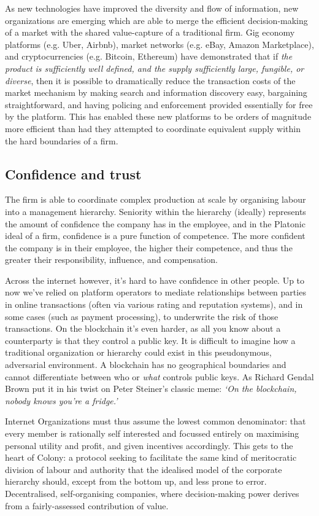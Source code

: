 As new technologies have improved the diversity and flow of information, new organizations are emerging which are able to merge the efficient decision-making of a market with the shared value-capture of a traditional firm. Gig economy platforms (e.g. Uber, Airbnb), market networks (e.g. eBay, Amazon Marketplace), and cryptocurrencies (e.g. Bitcoin, Ethereum) have demonstrated that if \textit{the product is sufficiently well defined, and the supply sufficiently large, fungible, or diverse}, then it is possible to dramatically reduce the transaction costs of the market mechanism by making search and information discovery easy, bargaining straightforward, and having policing and enforcement provided essentially for free by the platform. This has enabled these new platforms to be orders of magnitude more efficient than had they attempted to coordinate equivalent supply within the hard boundaries of a firm.

\subsection{Confidence and trust}

The firm is able to coordinate complex production at scale by organising labour into a management hierarchy. Seniority within the hierarchy (ideally) represents the amount of confidence the company has in the employee, and in the Platonic ideal of a firm, confidence is a pure function of competence. The more confident the company is in their employee, the higher their competence, and thus the greater their responsibility, influence, and compensation.

Across the internet however, it's hard to have confidence in other people. Up to now we've relied on platform operators to mediate relationships between parties in online transactions (often via various rating and reputation systems), and in some cases (such as payment processing), to underwrite the risk of those transactions. On the blockchain it's even harder, as all you know about a counterparty is that they control a public key. It is difficult to imagine how a traditional organization or hierarchy could exist in this pseudonymous, adversarial environment. A blockchain has no geographical boundaries and cannot differentiate between who or \textit{what} controls public keys. As Richard Gendal Brown put it in his twist on Peter Steiner’s classic meme: \textit{`On the blockchain, nobody knows you're a fridge.'}

Internet Organizations must thus assume the lowest common denominator: that every member is rationally self interested and focussed entirely on maximising personal utility and profit, and given incentives accordingly. This gets to the heart of Colony: a protocol seeking to facilitate the same kind of meritocratic division of labour and authority that the idealised model of the corporate hierarchy should, except from the bottom up, and less prone to error. Decentralised, self-organising companies, where decision-making power derives from a fairly-assessed contribution of value. \\

